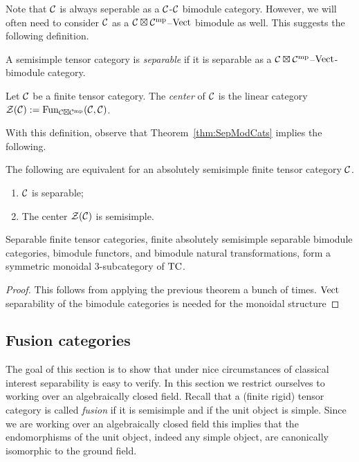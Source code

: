 \documentclass{amsart}
\begin{document}
Note that $\mathcal C$ is always seperable as a $\mathcal C$-$\mathcal C$ bimodule category.  However, we will often need to consider $\mathcal C$ as a $\mathcal C \boxtimes \mathcal C^{\mathrm{mp}}$--$\mathrm{Vect}$ bimodule as well.  This suggests the following definition.

\begin{definition}
	A semisimple tensor category is {\em separable} if it is separable as a $\mathcal C \boxtimes \mathcal C^{\mathrm{mp}}$--$\mathrm{Vect}$-bimodule category.  
\end{definition}


\begin{definition}
	Let $\mathcal C$ be a finite tensor category. The {\em center} of $\mathcal C$ is the linear category $\mathcal Z(\mathcal C) := \operatorname{Fun}_{\mathcal C \boxtimes \mathcal C^{\mathrm{mp}}}(\mathcal C, \mathcal C)$.
\end{definition}

With this definition, observe that Theorem~\ref{thm:SepModCats} implies the following.

\begin{corollary} \label{cor:Sep=semisimplecenter}
	The following are equivalent for an absolutely semisimple finite tensor category $\mathcal C$.
	\begin{enumerate}
		\item $\mathcal C$ is separable;
		\item The center $\mathcal Z(\mathcal C)$ is semisimple.
	\end{enumerate} 
\end{corollary}

\begin{theorem}
Separable finite tensor categories, finite absolutely semisimple separable bimodule categories, bimodule functors, and bimodule natural transformations, form a symmetric monoidal $3$-subcategory of $\mathrm{TC}$.
\end{theorem}
\begin{proof}
This follows from applying the previous theorem a bunch of times.  $\mathrm{Vect}$ separability of the bimodule categories is needed for the monoidal structure
\end{proof}


\subsection{Fusion categories} \label{sec:tc-fusion}

The goal of this section is to show that under nice circumstances of classical interest  separability is easy to verify. In this section we restrict ourselves to working over an algebraically closed field. Recall that a (finite rigid) tensor category is called \emph{fusion} if it is semisimple and if the unit object is simple. Since we are working over an algebraically closed field this implies that the endomorphisms of the unit object, indeed any simple object, are canonically isomorphic to the ground field. 
\end{document}
